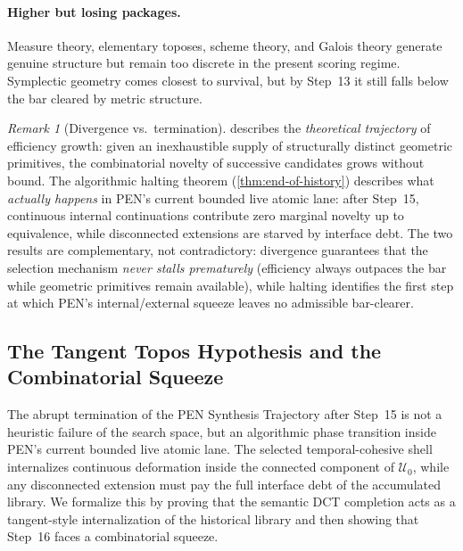 \documentclass[11pt,a4paper]{article}
\theoremstyle{plain}
\theoremstyle{definition}
\theoremstyle{remark}
\newtheorem{remark}[theorem]{Remark}
\newcommand{\U}{\mathcal{U}}
\begin{document}
\paragraph{Higher but losing packages.}
Measure theory, elementary toposes, scheme theory, and Galois theory generate genuine structure but remain too discrete in the present scoring regime. Symplectic geometry comes closest to survival, but by Step~13 it still falls below the bar cleared by metric structure.

\begin{remark}[Divergence vs.\ termination]
\label{rem:divergence-vs-termination}
 describes the \emph{theoretical trajectory} of efficiency growth: given an inexhaustible supply of structurally distinct geometric primitives, the combinatorial novelty of successive candidates grows without bound.
The algorithmic halting theorem (\cref{thm:end-of-history}) describes what \emph{actually happens} in PEN's current bounded live atomic lane: after Step~15, continuous internal continuations contribute zero marginal novelty up to equivalence, while disconnected extensions are starved by interface debt.
The two results are complementary, not contradictory: divergence guarantees that the selection mechanism \emph{never stalls prematurely} (efficiency always outpaces the bar while geometric primitives remain available), while halting identifies the first step at which PEN's internal/external squeeze leaves no admissible bar-clearer.
\end{remark}

\subsection{The Tangent Topos Hypothesis and the Combinatorial Squeeze}
\label{sec:tangent-topos}

The abrupt termination of the PEN Synthesis Trajectory after Step~15 is not a heuristic failure of the search space, but an algorithmic phase transition inside PEN's current bounded live atomic lane. The selected temporal-cohesive shell internalizes continuous deformation inside the connected component of $\U_0$, while any disconnected extension must pay the full interface debt of the accumulated library. We formalize this by proving that the semantic DCT completion acts as a tangent-style internalization of the historical library and then showing that Step~16 faces a combinatorial squeeze.
\end{document}
